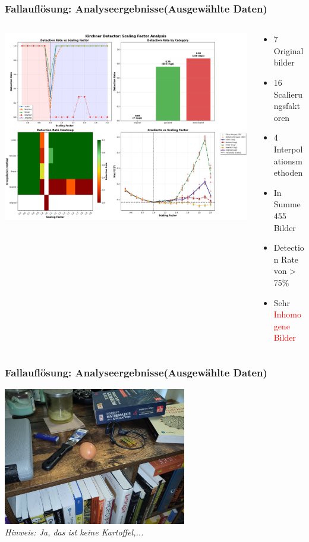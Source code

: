 \documentclass[11pt,t,usepdftitle=false,aspectratio=169]{beamer}
\begin{document}
\begin{frame}
	\frametitle{Fallauflösung: Analyseergebnisse(Ausgewählte Daten)}
	\begin{columns}[T]
		\begin{column}{0.6\textwidth}
			\includegraphics[width=\textwidth]{images/scaling_analysis_report.png}
		\end{column}
		\begin{column}{0.40\textwidth}
			\begin{itemize}
				\item 7 Originalbilder
				\item 16 Scalierungsfaktoren
				\item 4 Interpolationsmethoden
				\item In Summe 455 Bilder
				\item Detection Rate von > 75\%
				\item Sehr \textcolor{red}{Inhomogene Bilder} 
			\end{itemize}
		\end{column}
	\end{columns}
\end{frame}

\begin{frame}
	\frametitle{Fallauflösung: Analyseergebnisse(Ausgewählte Daten)}
	\begin{center}
		\includegraphics[width=0.6\textwidth]{images/img_cluttered.jpg}\\
		\textit{Hinweis: Ja, das ist keine Kartoffel,...}
	\end{center}
\end{frame}
\end{document}
